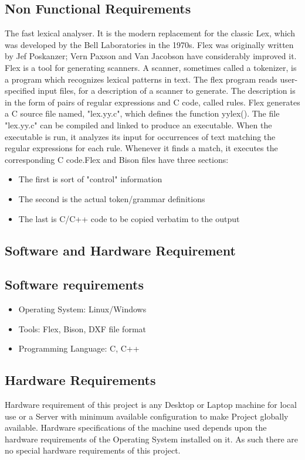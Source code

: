 \subsection{Non Functional Requirements}
The fast lexical analyser. It is the modern replacement for the classic Lex, which was developed by the Bell Laboratories in the 1970s.
Flex was originally written by Jef Poskanzer; Vern Paxson and Van Jacobson have considerably improved it. Flex is a tool for generating scanners. A scanner, sometimes called a tokenizer, is a program which recognizes lexical patterns in text. The flex program reads user-specified input files, for a description of a scanner to generate. The description is in the form of pairs of regular expressions and C code, called rules. Flex generates a C source file named, "lex.yy.c", which defines the function yylex(). The file "lex.yy.c" can be compiled and linked to produce an executable. When the executable is run, it analyzes its input for occurrences of text matching the regular expressions for each rule. Whenever it finds a match, it executes the corresponding C code.Flex and Bison files have three sections:\\
\begin{itemize}
\item The first is sort of "control" information
\item The second is the actual token/grammar definitions
\item The last is C/C++ code to be copied verbatim to the output
\end{itemize}




\subsection{Software and Hardware Requirement}
\subsection{Software requirements}
\begin{itemize}
\item Operating System: Linux/Windows
\item Tools: Flex, Bison, DXF file format
\item Programming Language: C, C++
\end{itemize}


\subsection{Hardware Requirements}
Hardware requirement of this project is any Desktop or Laptop machine for local use or a Server with minimum available configuration to make Project globally available. Hardware specifications of the machine used depends upon the hardware requirements of the Operating System installed on it. As such there are no special hardware requirements of this project.\\


